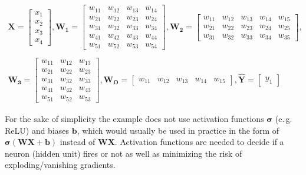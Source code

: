 \begin{equation} \label{eq:2}
\begin{gathered}
\mathbf{X} = \begin{bmatrix}
           x_{1} \\
           x_{2} \\
           x_{3} \\
           x_{4}
         \end{bmatrix},
\mathbf{W_1} = \begin{bmatrix}
           w_{11} & w_{12}& w_{13}& w_{14}\\
           w_{21} & w_{22}& w_{23}& w_{24} \\
           w_{31} & w_{32}& w_{33}& w_{34} \\
           w_{41} & w_{42}& w_{43}& w_{44} \\
           w_{51} & w_{52}& w_{53}& w_{54} 
         \end{bmatrix},
\mathbf{W_2} = \begin{bmatrix}
           w_{11} & w_{12}& w_{13}& w_{14}& w_{15}\\
           w_{21} & w_{22}& w_{23}& w_{24}& w_{25} \\
           w_{31} & w_{32}& w_{33}& w_{34}& w_{35} 
         \end{bmatrix},\\ \\
\mathbf{W_3} = \begin{bmatrix}
           w_{11} & w_{12}& w_{13}\\
           w_{21} & w_{22}& w_{23} \\
           w_{31} & w_{32}& w_{33} \\
           w_{41} & w_{42}& w_{43} \\
           w_{51} & w_{52}& w_{53} 
         \end{bmatrix},
\mathbf{W_O} = \begin{bmatrix} w_{11} & w_{12}& w_{13}& w_{14}& w_{15} \end{bmatrix},
\mathbf{\hat{Y}} = \begin{bmatrix} y_1 \end{bmatrix}
\end{gathered}
\end{equation}

For the sake of simplicity the example does not use activation functions $\mathbf{\sigma}$ (e.\,g. ReLU) and biases $\mathbf{b}$, which would usually be used in practice in the form of $\mathbf{\sigma(WX+b)}$ instead of $\mathbf{WX}$.
Activation functions are needed to decide if a neuron (hidden unit) fires or not as well as minimizing the risk of exploding/vanishing gradients.


